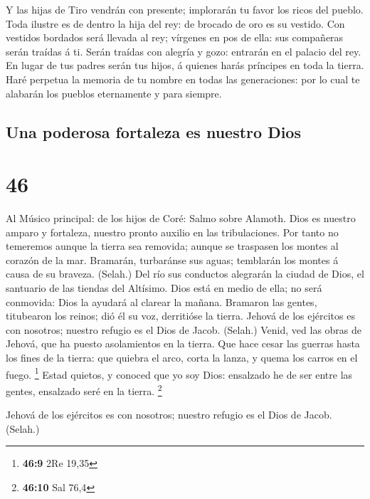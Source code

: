  Y las hijas de Tiro vendrán con presente; implorarán tu
favor los ricos del pueblo.  Toda ilustre es de dentro la
hija del rey: de brocado de oro es su vestido.  Con
vestidos bordados será llevada al rey; vírgenes en pos de ella: sus
compañeras serán traídas á ti.  Serán traídas con alegría y
gozo: entrarán en el palacio del rey.  En lugar de tus
padres serán tus hijos, á quienes harás príncipes en toda la tierra.
 Haré perpetua la memoria de tu nombre en todas las
generaciones: por lo cual te alabarán los pueblos eternamente y para
siempre.

\hypertarget{una-poderosa-fortaleza-es-nuestro-dios}{%
\subsection{Una poderosa fortaleza es nuestro
Dios}\label{una-poderosa-fortaleza-es-nuestro-dios}}

\hypertarget{section-45}{%
\section{46}\label{section-45}}

 Al Músico principal: de los hijos de Coré: Salmo sobre
Alamoth. Dios es nuestro amparo y fortaleza, nuestro pronto auxilio en
las tribulaciones.  Por tanto no temeremos aunque la tierra
sea removida; aunque se traspasen los montes al corazón de la mar.
 Bramarán, turbaránse sus aguas; temblarán los montes á
causa de su braveza. (Selah.)  Del río sus conductos
alegrarán la ciudad de Dios, el santuario de las tiendas del Altísimo.
 Dios está en medio de ella; no será conmovida: Dios la
ayudará al clarear la mañana.  Bramaron las gentes,
titubearon los reinos; dió él su voz, derritióse la tierra. 
Jehová de los ejércitos es con nosotros; nuestro refugio es el Dios de
Jacob. (Selah.)  Venid, ved las obras de Jehová, que ha
puesto asolamientos en la tierra.  Que hace cesar las
guerras hasta los fines de la tierra: que quiebra el arco, corta la
lanza, y quema los carros en el fuego. \footnote{\textbf{46:9} 2Re 19,35}
 Estad quietos, y conoced que yo soy Dios: ensalzado he de
ser entre las gentes, ensalzado seré en la tierra. \footnote{\textbf{46:10}
  Sal 76,4}

 Jehová de los ejércitos es con nosotros; nuestro refugio
es el Dios de Jacob. (Selah.)

